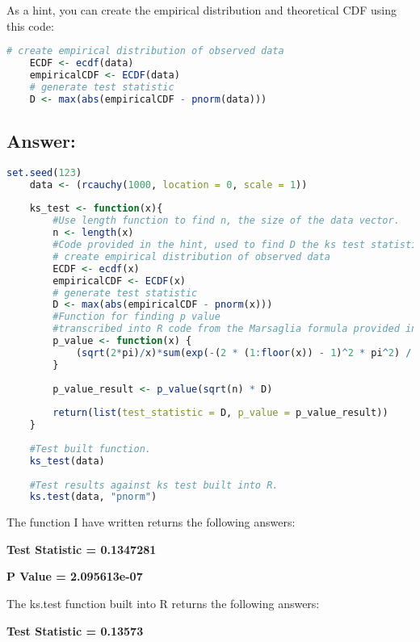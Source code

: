 \documentclass[12pt,letterpaper]{article}
\begin{document}
	
\noindent As a hint, you can create the empirical distribution and theoretical CDF using this code:

\begin{lstlisting}[language=R]
	# create empirical distribution of observed data
	ECDF <- ecdf(data)
	empiricalCDF <- ECDF(data)
	# generate test statistic
	D <- max(abs(empiricalCDF - pnorm(data))) \end{lstlisting}

\vspace{1cm}

\subsection*{Answer:}

\begin{lstlisting}[language=R]
	set.seed(123)
	data <- (rcauchy(1000, location = 0, scale = 1))
	
	ks_test <- function(x){
		#Use length function to find n, the size of the data vector.
		n <- length(x)
		#Code provided in the hint, used to find D the ks test statistic.
		# create empirical distribution of observed data
		ECDF <- ecdf(x)
		empiricalCDF <- ECDF(x)
		# generate test statistic
		D <- max(abs(empiricalCDF - pnorm(x)))
		#Function for finding p value
		#transcribed into R code from the Marsaglia formula provided in the question. 
		p_value <- function(x) {
			(sqrt(2*pi)/x)*sum(exp(-(2 * (1:floor(x)) - 1)^2 * pi^2) / (8 * x^2))
		}
		
		p_value_result <- p_value(sqrt(n) * D)
		
		return(list(test_statistic = D, p_value = p_value_result))
	}
	
	#Test built function.
	ks_test(data)
	
	#Test results against ks test built into R. 
	ks.test(data, "pnorm")
	 \end{lstlisting}
	 
	 \vspace{1cm}
	 
	 The function I have written returns the following answers:
	  
	\textbf{Test Statistic = 0.1347281}
	
	\textbf{P Value = 2.095613e-07}
	
	\vspace{1cm}
	
	The ks.test function built into R returns the following answers:
	
   \textbf{Test Statistic = 0.13573}
   
\end{document}
